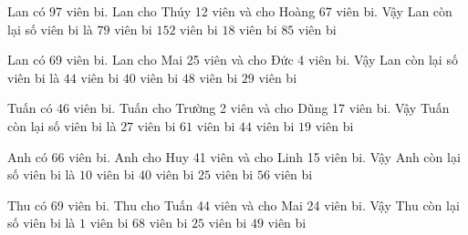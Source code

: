 \documentclass[12pt,a4paper]{article}
\begin{document}
\begin{ex}
Lan có 97 viên bi. Lan cho Thúy 12 viên và cho Hoàng 67 viên bi. Vậy Lan còn lại số viên bi là
 \choice 
{$79$ viên bi}
{$152$ viên bi}
{\True $18$ viên bi}
{$85$ viên bi}
\end{ex}
\begin{ex}
Lan có 69 viên bi. Lan cho Mai 25 viên và cho Đức 4 viên bi. Vậy Lan còn lại số viên bi là
 \choice 
{$44$ viên bi}
{\True $40$ viên bi}
{$48$ viên bi}
{$29$ viên bi}
\end{ex}
\begin{ex}
Tuấn có 46 viên bi. Tuấn cho Trường 2 viên và cho Dũng 17 viên bi. Vậy Tuấn còn lại số viên bi là
 \choice 
{\True $27$ viên bi}
{$61$ viên bi}
{$44$ viên bi}
{$19$ viên bi}
\end{ex}
\begin{ex}
Anh có 66 viên bi. Anh cho Huy 41 viên và cho Linh 15 viên bi. Vậy Anh còn lại số viên bi là
 \choice 
{\True $10$ viên bi}
{$40$ viên bi}
{$25$ viên bi}
{$56$ viên bi}
\end{ex}
\begin{ex}
Thu có 69 viên bi. Thu cho Tuấn 44 viên và cho Mai 24 viên bi. Vậy Thu còn lại số viên bi là
 \choice 
{\True $1$ viên bi}
{$68$ viên bi}
{$25$ viên bi}
{$49$ viên bi}
\end{ex}

\end{document}
